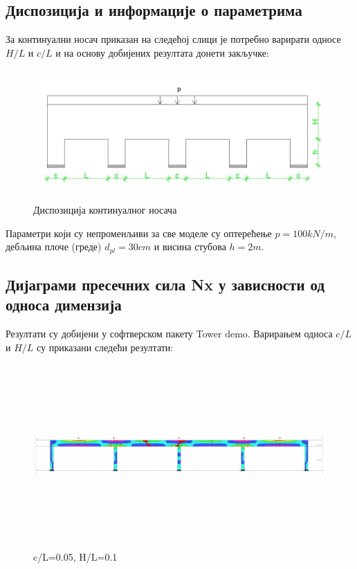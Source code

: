 \documentclass[11pt, a4paper]{article}
\begin{document}
\subsection{Диспозиција и информације о параметрима}
За континуални носач приказан на следећој слици је потребно варирати односе $H/L$ и $c/L$ и на основу добијених резултата донети закључке:
\begin{figure}[H]
	\includegraphics[width=\textwidth, height=5cm]{Slike/Dispozicija.jpg}
	\caption{Диспозиција континуалног носача}
\end{figure}
Параметри који су непроменљиви за све моделе су оптерећење $p=100 kN/m$, дебљина плоче (греде) $d_{pl} = 30cm$ и висина стубова $h=2m$.

\subsection{Дијаграми пресечних сила Nx у зависности од односа димензија}

Резултати су добијени у софтверском пакету Tower demo. Варирањем односа $c/L$ и $H/L$ су приказани следећи резултати:
\newpage
\begin{figure}[H]
	\includegraphics[width=\textwidth, height=7cm]{Slike/C-L_0-05 (0-1).png}
	\caption{c/L=0.05, H/L=0.1}
\end{figure}
\end{document}
